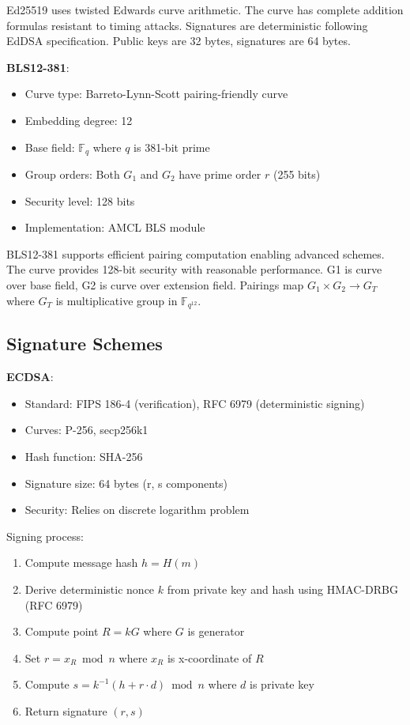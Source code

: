 Ed25519 uses twisted Edwards curve arithmetic. The curve has complete
addition formulas resistant to timing attacks. Signatures are
deterministic following EdDSA specification. Public keys are 32 bytes,
signatures are 64 bytes.

\textbf{BLS12-381}:

\begin{itemize}
\item Curve type: Barreto-Lynn-Scott pairing-friendly curve
\item Embedding degree: 12
\item Base field: $\mathbb{F}_q$ where $q$ is 381-bit prime
\item Group orders: Both $G_1$ and $G_2$ have prime order $r$ (255
  bits)
\item Security level: 128 bits
\item Implementation: AMCL BLS module
\end{itemize}

BLS12-381 supports efficient pairing computation enabling advanced
schemes. The curve provides 128-bit security with reasonable
performance. G1 is curve over base field, G2 is curve over extension
field. Pairings map $G_1 \times G_2 \rightarrow G_T$ where $G_T$ is
multiplicative group in $\mathbb{F}_{q^{12}}$.

\subsection{Signature Schemes}

\textbf{ECDSA}:

\begin{itemize}
\item Standard: FIPS 186-4 (verification), RFC 6979 (deterministic
  signing)
\item Curves: P-256, secp256k1
\item Hash function: SHA-256
\item Signature size: 64 bytes (r, s components)
\item Security: Relies on discrete logarithm problem
\end{itemize}

Signing process:
\begin{enumerate}
\item Compute message hash $h = H(m)$
\item Derive deterministic nonce $k$ from private key and hash using
  HMAC-DRBG (RFC 6979)
\item Compute point $R = kG$ where $G$ is generator
\item Set $r = x_R \bmod n$ where $x_R$ is x-coordinate of $R$
\item Compute $s = k^{-1}(h + r \cdot d) \bmod n$ where $d$ is private
  key
\item Return signature $(r, s)$
\end{enumerate}


